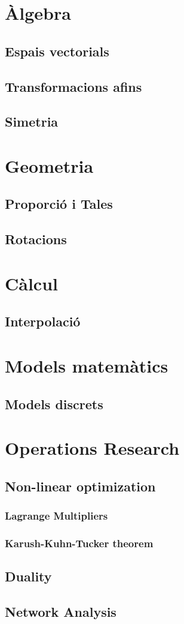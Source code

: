 \section{Àlgebra}
\subsection{Espais vectorials}
\subsection{Transformacions afins}
\subsection{Simetria}
\section{Geometria}
\subsection{Proporció i Tales}
\subsection{Rotacions}
\section{Càlcul}
\subsection{Interpolació}
\section{Models matemàtics}
\subsection{Models discrets}
\section{Operations Research}
\subsection{Non-linear optimization}
\subsubsection{Lagrange Multipliers}
\subsubsection{Karush-Kuhn-Tucker theorem}
\subsection{Duality}
\subsection{Network Analysis}